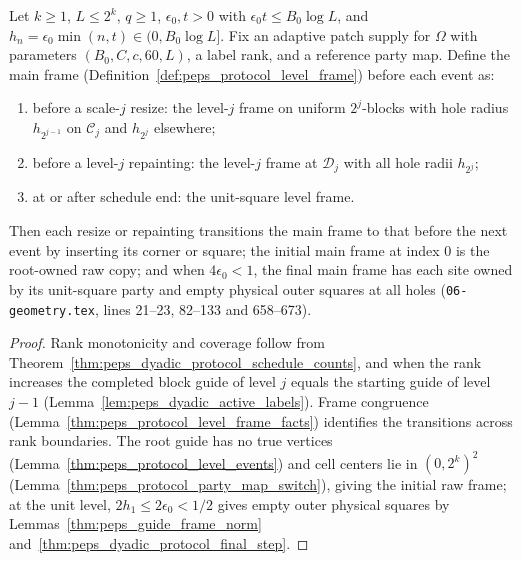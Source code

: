 \begin{lemma}
    Let $k\ge1$, $L\le 2^k$, $q\ge1$, $\epsilon_0,t>0$ with $\epsilon_0t\le B_0\log L$, and $h_n=\epsilon_0\min(n,t)\in(0,B_0\log L]$. Fix an adaptive patch supply for $\Omega$ with parameters $(B_0,C,c,60,L)$, a label rank, and a reference party map. Define the main frame (Definition~\ref{def:peps_protocol_level_frame}) before each event as:
    \begin{enumerate}
        \item before a scale-$j$ resize: the level-$j$ frame on uniform $2^j$-blocks with hole radius $h_{2^{j-1}}$ on $\mathcal C_j$ and $h_{2^j}$ elsewhere;
        \item before a level-$j$ repainting: the level-$j$ frame at $\mathcal D_j$ with all hole radii $h_{2^j}$;
        \item at or after schedule end: the unit-square level frame.
    \end{enumerate}
    Then each resize or repainting transitions the main frame to that before the next event by inserting its corner or square; the initial main frame at index $0$ is the root-owned raw copy; and when $4\epsilon_0<1$, the final main frame has each site owned by its unit-square party and empty physical outer squares at all holes (\texttt{06-geometry.tex}, lines 21--23, 82--133 and 658--673).
\end{lemma}

\begin{proof}\leanok
    Rank monotonicity and coverage follow from Theorem~\ref{thm:peps_dyadic_protocol_schedule_counts}, and when the rank increases the completed block guide of level $j$ equals the starting guide of level $j-1$ (Lemma~\ref{lem:peps_dyadic_active_labels}). Frame congruence (Lemma~\ref{thm:peps_protocol_level_frame_facts}) identifies the transitions across rank boundaries. The root guide has no true vertices (Lemma~\ref{thm:peps_protocol_level_events}) and cell centers lie in $(0,2^k)^2$ (Lemma~\ref{thm:peps_protocol_party_map_switch}), giving the initial raw frame; at the unit level, $2h_1\le 2\epsilon_0<1/2$ gives empty outer physical squares by Lemmas~\ref{thm:peps_guide_frame_norm} and~\ref{thm:peps_dyadic_protocol_final_step}.
\end{proof}

